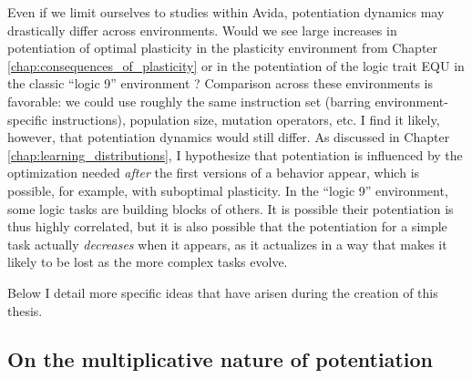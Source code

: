 Even if we limit ourselves to studies within Avida, potentiation dynamics may drastically differ across environments. 
Would we see large increases in potentiation of optimal plasticity in the plasticity environment from Chapter \ref{chap:consequences_of_plasticity} or in the potentiation of the logic trait EQU in the classic ``logic 9'' environment \citep{ofriaAvidaSoftwarePlatform2004a}?
Comparison across these environments is favorable: we could use roughly the same instruction set (barring environment-specific instructions), population size, mutation operators, etc. 
I find it likely, however, that potentiation dynamics would still differ.
As discussed in Chapter \ref{chap:learning_distributions}, I hypothesize that potentiation is influenced by the optimization needed \textit{after} the first versions of a behavior appear, which is possible, for example, with suboptimal plasticity. 
In the ``logic 9'' environment, some logic tasks are building blocks of others. 
It is possible their potentiation is thus highly correlated, but it is also possible that the potentiation for a simple task actually \textit{decreases} when it appears, as it actualizes in a way that makes it likely to be lost as the more complex tasks evolve. 


Below I detail more specific ideas that have arisen during the creation of this thesis. 

\subsection{On the multiplicative nature of potentiation}

